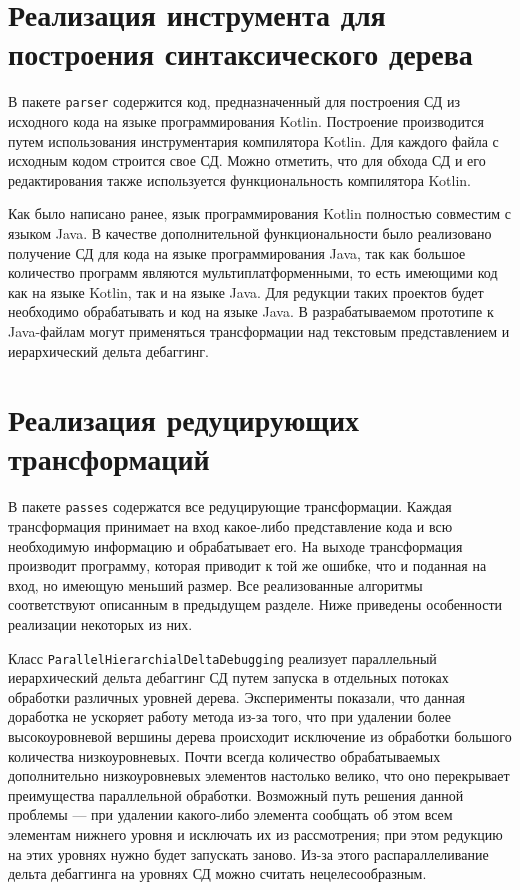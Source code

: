 \section{Реализация инструмента для построения синтаксического дерева}
В пакете \texttt{parser} содержится код, предназначенный для построения СД из исходного кода на языке программирования Kotlin. Построение производится путем использования инструментария компилятора Kotlin. Для каждого файла с исходным кодом строится свое СД. Можно отметить, что для обхода СД и его редактирования также используется функциональность компилятора Kotlin.

Как было написано ранее, язык программирования Kotlin полностью совместим с языком Java. В качестве дополнительной функциональности было реализовано получение СД для кода на языке программирования Java, так как большое количество программ являются мультиплатформенными, то есть имеющими код как на языке Kotlin, так и на языке Java. Для редукции таких проектов будет необходимо обрабатывать и код на языке Java. В разрабатываемом прототипе к Java-файлам могут применяться трансформации над текстовым представлением и иерархический дельта дебаггинг.

\section{Реализация редуцирующих трансформаций}
В пакете \texttt{passes} содержатся все редуцирующие трансформации. Каждая трансформация принимает на вход какое-либо представление кода и всю необходимую информацию и обрабатывает его. На выходе трансформация производит программу, которая приводит к той же ошибке, что и поданная на вход, но имеющую меньший размер. Все реализованные алгоритмы соответствуют описанным в предыдущем разделе. Ниже приведены особенности реализации некоторых из них.

Класс \texttt{ParallelHierarchialDeltaDebugging} реализует параллельный иерархический дельта дебаггинг СД путем запуска в отдельных потоках обработки различных уровней дерева. Эксперименты показали, что данная доработка не ускоряет работу метода из-за того, что при удалении более высокоуровневой вершины дерева происходит исключение из обработки большого количества низкоуровневых. Почти всегда количество обрабатываемых дополнительно низкоуровневых элементов настолько велико, что оно перекрывает преимущества параллельной обработки. Возможный путь решения данной проблемы --- при удалении какого-либо элемента сообщать об этом всем элементам нижнего уровня и исключать их из рассмотрения; при этом редукцию на этих уровнях нужно будет запускать заново. Из-за этого распараллеливание дельта дебаггинга на уровнях СД можно считать нецелесообразным.

